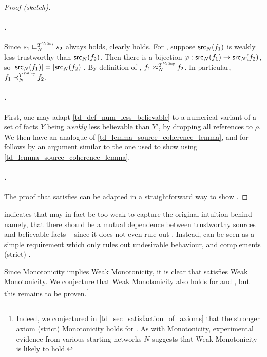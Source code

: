 \begin{proof}[Proof (sketch)]\leavevmode

    \paragraph{\voting{}.} Since $s_1 \sqsubseteq_N^{T^{\emph{Voting}}{}} s_2$ always holds,
    \weaksourcecoherence{} clearly holds. For \weakfactcoherence{}, suppose
    $\mathsf{src}_N(f_1)$ is weakly less trustworthy than $\mathsf{src}_N(f_2)$. Then there is
    a bijection $\varphi: \mathsf{src}_N(f_1) \to \mathsf{src}_N(f_2)$, so $|\mathsf{src}_N(f_1)| =
    |\mathsf{src}_N(f_2)|$. By definition of \voting{}, $f_1 \approx_N^{T^{\emph{Voting}}{}} f_2$.
    In particular, $f_1 \prec_N^{T^{\emph{Voting}}{}} f_2$.

    \paragraph{\sums{}.} First, one may adapt \cref{td_def_num_less_believable} to
    a numerical variant of a set of facts $Y$ being \emph{weakly} less
    believable than $Y'$, by dropping all references to $\rho$. We then have an
    analogue of \cref{td_lemma_source_coherence_lemma}, and \weakcoherence{} for
    \sums{} follows by an argument similar to the one used to show \coherence{}
    using \cref{td_lemma_source_coherence_lemma}.

    \paragraph{\usums{}.} The proof that \usums{} satisfies \coherence{} can be
    adapted in a straightforward way to show \weakcoherence{}.
\end{proof}

 indicates that \weakcoherence{} may
in fact be too weak to capture the original intuition behind \coherence{} --
namely, that there should be a mutual dependence between trustworthy sources
and believable facts -- since it does not even rule out \voting{}. Instead,
\weakcoherence{} can be seen as a simple requirement which only rules out
undesirable behaviour, and complements (strict) \coherence{}.

Since Monotonicity implies Weak Monotonicity, it is clear that \voting{}
satisfies Weak Monotonicity. We conjecture that Weak Monotonicity also holds
for \sums{} and \usums{}, but this remains to be proven.\footnote{Indeed, we
conjectured in \cref{td_sec_satisfaction_of_axioms} that the stronger axiom
(strict) Monotonicity holds for \usums{}. As with Monotonicity, experimental
evidence from various starting networks $N$ suggests that Weak Monotonicity is
likely to hold.}

